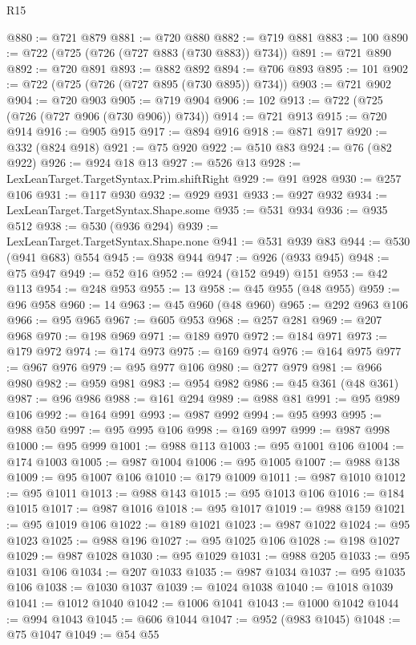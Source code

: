 \begin{lexlean}{R15}
\begin{coremodule}
{{{{{{{{{{{{{{{{{{{{{{{{{{{{{{{{{{{{{{{{{{{{{{{{{{{{{{{{{{{{{{{{{{{{{{@880 := @721 @879
@881 := @720 @880
@882 := @719 @881
@883 := 100
@890 := @722 (@725 (@726 (@727 @883 (@730 @883)) @734))
@891 := @721 @890
@892 := @720 @891
@893 := @882 @892
@894 := @706 @893
@895 := 101
@902 := @722 (@725 (@726 (@727 @895 (@730 @895)) @734))
@903 := @721 @902
@904 := @720 @903
@905 := @719 @904
@906 := 102
@913 := @722 (@725 (@726 (@727 @906 (@730 @906)) @734))
@914 := @721 @913
@915 := @720 @914
@916 := @905 @915
@917 := @894 @916
@918 := @871 @917
@920 := @332 (@824 @918)
@921 := @75 @920
@922 := @510 @83
@924 := @76 (@82 @922)
@926 := @924 @18 @13
@927 := @526 @13
@928 := LexLeanTarget.TargetSyntax.Prim.shiftRight
@929 := @91 @928
@930 := @257 @106
@931 := @117 @930
@932 := @929 @931
@933 := @927 @932
@934 := LexLeanTarget.TargetSyntax.Shape.some
@935 := @531 @934
@936 := @935 @512
@938 := @530 (@936 @294)
@939 := LexLeanTarget.TargetSyntax.Shape.none
@941 := @531 @939 @83
@944 := @530 (@941 @683) @554
@945 := @938 @944
@947 := @926 (@933 @945)
@948 := @75 @947
@949 := @52 @16
@952 := @924 (@152 @949) @151
@953 := @42 @113
@954 := @248 @953
@955 := 13
@958 := @45 @955 (@48 @955)
@959 := @96 @958
@960 := 14
@963 := @45 @960 (@48 @960)
@965 := @292 @963 @106
@966 := @95 @965
@967 := @605 @953
@968 := @257 @281
@969 := @207 @968
@970 := @198 @969
@971 := @189 @970
@972 := @184 @971
@973 := @179 @972
@974 := @174 @973
@975 := @169 @974
@976 := @164 @975
@977 := @967 @976
@979 := @95 @977 @106
@980 := @277 @979
@981 := @966 @980
@982 := @959 @981
@983 := @954 @982
@986 := @45 @361 (@48 @361)
@987 := @96 @986
@988 := @161 @294
@989 := @988 @81
@991 := @95 @989 @106
@992 := @164 @991
@993 := @987 @992
@994 := @95 @993
@995 := @988 @50
@997 := @95 @995 @106
@998 := @169 @997
@999 := @987 @998
@1000 := @95 @999
@1001 := @988 @113
@1003 := @95 @1001 @106
@1004 := @174 @1003
@1005 := @987 @1004
@1006 := @95 @1005
@1007 := @988 @138
@1009 := @95 @1007 @106
@1010 := @179 @1009
@1011 := @987 @1010
@1012 := @95 @1011
@1013 := @988 @143
@1015 := @95 @1013 @106
@1016 := @184 @1015
@1017 := @987 @1016
@1018 := @95 @1017
@1019 := @988 @159
@1021 := @95 @1019 @106
@1022 := @189 @1021
@1023 := @987 @1022
@1024 := @95 @1023
@1025 := @988 @196
@1027 := @95 @1025 @106
@1028 := @198 @1027
@1029 := @987 @1028
@1030 := @95 @1029
@1031 := @988 @205
@1033 := @95 @1031 @106
@1034 := @207 @1033
@1035 := @987 @1034
@1037 := @95 @1035 @106
@1038 := @1030 @1037
@1039 := @1024 @1038
@1040 := @1018 @1039
@1041 := @1012 @1040
@1042 := @1006 @1041
@1043 := @1000 @1042
@1044 := @994 @1043
@1045 := @606 @1044
@1047 := @952 (@983 @1045)
@1048 := @75 @1047
@1049 := @54 @55
}}}}}}}}}}}}}}}}}}}}}}}}}}}}}}}}}}}}}}}}}}}}}}}}}}}}}}}}}}}}}}}}}}}}}}
\end{coremodule}
\end{lexlean}
